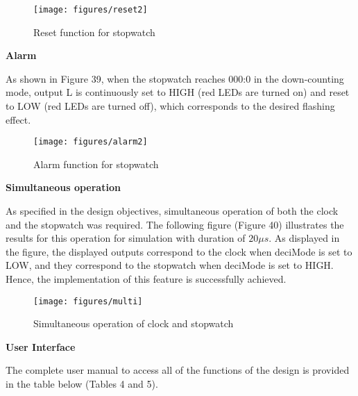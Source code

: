 \documentclass[12pt,a4paper]{article}
\begin{document}
	
	\begin{figure}[H]
		\centering
		\texttt{[image: figures/reset2]}
		\caption{Reset function for stopwatch}
	\end{figure}
	
	\noindent \textbf{Alarm}
	\vspace{0.2cm}
	
	\noindent As shown in Figure 39, when the stopwatch reaches 000:0 in the down-counting mode, output L is continuously set to HIGH (red LEDs are turned on) and reset to LOW (red LEDs are turned off), which corresponds to the desired flashing effect.
	
	\begin{figure}[H]
		\centering
		\texttt{[image: figures/alarm2]}
		\caption{Alarm function for stopwatch}
	\end{figure}
	
	
	\vspace{0.2cm}
	\noindent \textbf{\large Simultaneous operation}
	\vspace{0.2cm}
	
	\noindent As specified in the design objectives, simultaneous operation of both the clock and the stopwatch was required. The following figure (Figure 40) illustrates the results for this operation for simulation with duration of $20\mu s$. As displayed in the figure, the displayed outputs correspond to the clock when deciMode is set to LOW, and they correspond to the stopwatch  when deciMode is set to HIGH. Hence, the implementation of this feature is successfully achieved.
	
	\begin{figure}[H]
		\centering
		\texttt{[image: figures/multi]}
		\caption{Simultaneous operation of clock and stopwatch}
	\end{figure}
	
	\vspace{0.2cm}
	\noindent \textbf{\large User Interface}
	\vspace{0.2cm}
	
	\noindent The complete user manual to access all of the functions of the design is provided in the table below (Tables 4 and 5). 
	
\end{document}
